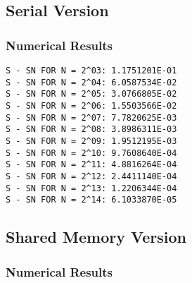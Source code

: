 \documentclass[a4paper, 12pt]{article}
\begin{document}
    \subsection{Serial Version} %
    \label{sub:serial_version}
        \subsubsection{Numerical Results} %
        \label{subsub:numerical_results}
            \begin{verbatim}
S - SN FOR N = 2^03: 1.1751201E-01
S - SN FOR N = 2^04: 6.0587534E-02
S - SN FOR N = 2^05: 3.0766805E-02
S - SN FOR N = 2^06: 1.5503566E-02
S - SN FOR N = 2^07: 7.7820625E-03
S - SN FOR N = 2^08: 3.8986311E-03
S - SN FOR N = 2^09: 1.9512195E-03
S - SN FOR N = 2^10: 9.7608640E-04
S - SN FOR N = 2^11: 4.8816264E-04
S - SN FOR N = 2^12: 2.4411140E-04
S - SN FOR N = 2^13: 1.2206344E-04
S - SN FOR N = 2^14: 6.1033870E-05
            \end{verbatim}

    \subsection{Shared Memory Version} %
    \label{sub:shared_memory_version}
        \subsubsection{Numerical Results} %
        \label{subsub:numerical_results}
        
\end{document}
